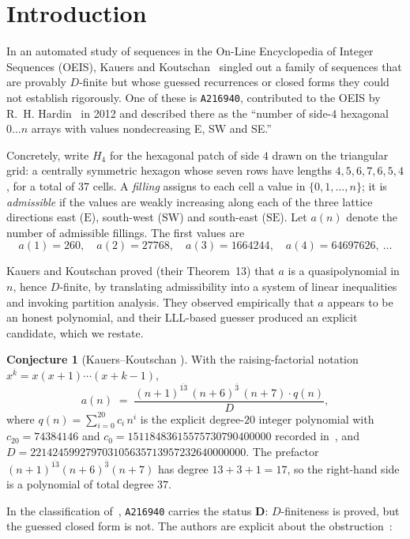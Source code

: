 \documentclass[11pt]{article}
\theoremstyle{plain}
\theoremstyle{definition}
\newtheorem{conjecture}[theorem]{Conjecture}
\theoremstyle{remark}
\newcommand{\OEIS}[1]{\texttt{#1}}
\newcommand{\Eseq}{\mathrm{E}}
\newcommand{\SW}{\mathrm{SW}}
\newcommand{\SE}{\mathrm{SE}}
\begin{document}
\section{Introduction}

In an automated study of sequences in the On-Line Encyclopedia of Integer Sequences (OEIS),
Kauers and Koutschan~\cite{KK23} singled out a family of sequences that are provably
$D$-finite but whose guessed recurrences or closed forms they could not establish rigorously.
One of these is \OEIS{A216940}, contributed to the OEIS by R.~H. Hardin~\cite{OEIS} in 2012
and described there as the ``number of side-$4$ hexagonal $0\dots n$ arrays with values
nondecreasing E, SW and SE.''

Concretely, write $H_4$ for the hexagonal patch of side $4$ drawn on the triangular grid: a
centrally symmetric hexagon whose seven rows have lengths $4,5,6,7,6,5,4$, for a total of $37$
cells. A \emph{filling} assigns to each cell a value in $\{0,1,\dots,n\}$; it is
\emph{admissible} if the values are weakly increasing along each of the three lattice
directions east ($\Eseq$), south-west ($\SW$) and south-east ($\SE$). Let $a(n)$ denote the
number of admissible fillings. The first values are
\[
  a(1)=260,\quad a(2)=27768,\quad a(3)=1664244,\quad a(4)=64697626,\ \dots
\]

Kauers and Koutschan proved (their Theorem~13) that $a$ is a quasipolynomial in $n$, hence
$D$-finite, by translating admissibility into a system of linear inequalities and invoking
partition analysis. They observed empirically that $a$ appears to be an honest polynomial, and
their LLL-based guesser produced an explicit candidate, which we restate.

\begin{conjecture}[Kauers--Koutschan {\cite[\S5.1]{KK23}}]\label{conj12}
With the raising-factorial notation $x^{\overline{k}}=x(x+1)\cdots(x+k-1)$,
\[
  a(n)\;=\;\frac{(n+1)^{\overline{13}}\,(n+6)^{\overline{3}}\,(n+7)\cdot q(n)}{D},
\]
where $q(n)=\sum_{i=0}^{20} c_i\,n^{i}$ is the explicit degree-$20$ integer polynomial with
$c_{20}=74384146$ and $c_0=15118483615575730790400000$ recorded in~\cite[\S5.1]{KK23}, and
$D=221424599279703105635713957232640000000$. The prefactor
$(n+1)^{\overline{13}}(n+6)^{\overline{3}}(n+7)$ has degree $13+3+1=17$, so the right-hand side
is a polynomial of total degree $37$.
\end{conjecture}

In the classification of~\cite[Table~1]{KK23}, \OEIS{A216940} carries the status \textbf{D}:
$D$-finiteness is proved, but the guessed closed form is not. The authors are explicit about
the obstruction~\cite[\S5.1]{KK23}:
\end{document}

